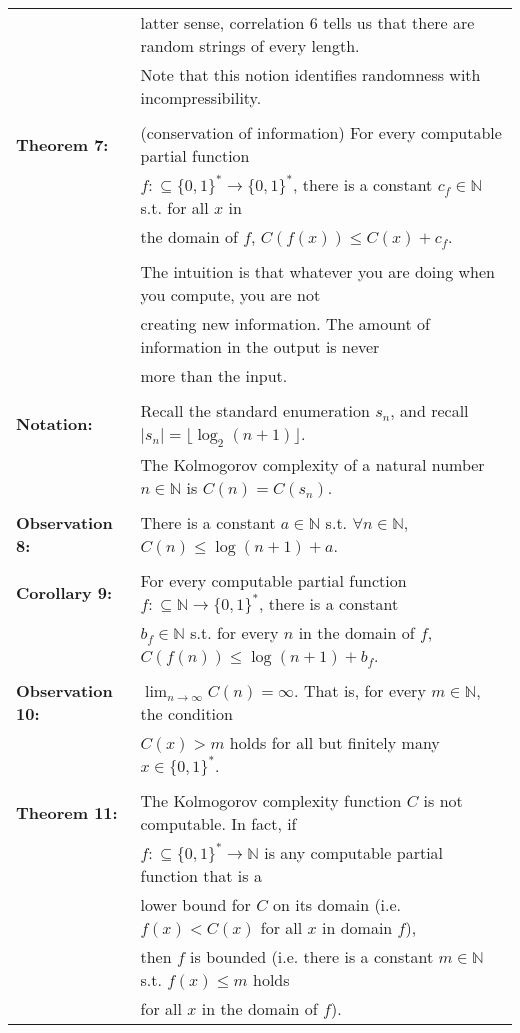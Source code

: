 \documentclass[11pt]{article}
\begin{document}
\begin{longtable}{ll}
& latter sense, correlation 6 tells us that there are random strings of every length. \\
& Note that this notion identifies randomness with incompressibility. \\
\\
{\bf Theorem 7:} & (conservation of information) For every computable partial function \\
& $f:\subseteq\{0,1\}^*\rightarrow\{0,1\}^*$, there is a constant $c_f\in\mathbb{N}$ s.t. for all $x$ in \\
& the domain of $f$, $C(f(x)) \leqslant C(x) + c_f$. \\
& \\
& The intuition is that whatever you are doing when you compute, you are not \\
& creating new information. The amount of information in the output is never \\
& more than the input. \\
\\
{\bf Notation:} & Recall the standard enumeration $s_n$, and recall $|s_n|=\lfloor \log_2(n+1)\rfloor$. \\
& The Kolmogorov complexity of a natural number $n\in\mathbb{N}$ is $C(n)=C(s_n)$. \\
\\
{\bf Observation 8:} & There is a constant $a\in\mathbb{N}$ s.t. $\forall n\in\mathbb{N}$, $C(n) \leqslant \log(n+1) + a$. \\
\\
{\bf Corollary 9:} & For every computable partial function $f:\subseteq\mathbb{N}\rightarrow\{0,1\}^*$, there is a constant \\
& $b_f\in\mathbb{N}$ s.t. for every $n$ in the domain of $f$, $C(f(n))\leqslant \log(n+1) + b_f$. \\
\\
{\bf Observation 10:} & $\lim_{n\to\infty}C(n)=\infty$. That is, for every $m\in\mathbb{N}$, the condition \\
& $C(x) > m$ holds for all but finitely many $x\in\{0,1\}^*$. \\
\\
{\bf Theorem 11:} & The Kolmogorov complexity function $C$ is not computable. In fact, if \\
& $f:\subseteq\{0,1\}^*\rightarrow\mathbb{N}$ is any computable partial function that is a \\
& lower bound for $C$ on its domain (i.e. $f(x) < C(x)$ for all $x$ in domain $f$), \\
& then $f$ is bounded (i.e. there is a constant $m\in\mathbb{N}$ s.t. $f(x) \leqslant m$ holds \\
& for all $x$ in the domain of $f$). \\
\end{longtable}
\end{document}
